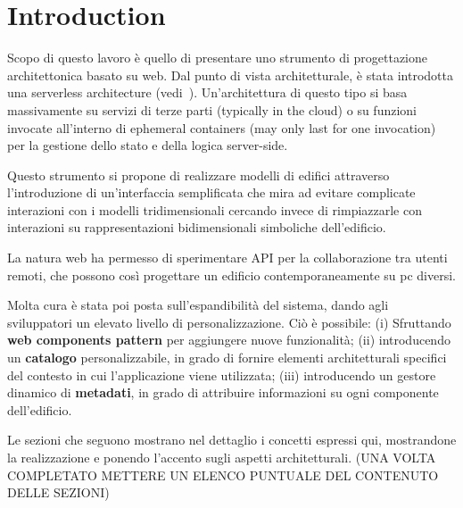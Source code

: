 \section{Introduction}

Scopo di questo lavoro \`e quello di presentare uno strumento di progettazione architettonica basato su web. Dal punto di vista architetturale, \`e stata introdotta una serverless architecture (vedi~\cite{Roberts}). Un'architettura di questo tipo si basa massivamente su servizi di terze parti (typically in the cloud) o su funzioni invocate all'interno di ephemeral containers (may only last for one invocation) per la gestione dello stato e della logica server-side.

Questo strumento si propone di realizzare modelli di edifici attraverso l'introduzione di un'interfaccia semplificata che mira ad evitare complicate interazioni con i modelli tridimensionali cercando invece di rimpiazzarle con interazioni su rappresentazioni bidimensionali simboliche dell'edificio.

La natura web ha permesso di sperimentare API per la collaborazione tra utenti remoti, che possono cos\`i progettare un edificio contemporaneamente su pc diversi.

Molta cura \`e stata poi posta sull'espandibilit\`a del sistema, dando agli sviluppatori un elevato livello di personalizzazione. Ci\`o \`e possibile: (i) Sfruttando \textbf{web components pattern} per aggiungere nuove funzionalità; (ii) introducendo un \textbf{catalogo} personalizzabile, in grado di fornire elementi architetturali specifici del contesto in cui l'applicazione viene utilizzata; (iii) introducendo un gestore dinamico di \textbf{metadati}, in grado di attribuire informazioni su ogni componente dell'edificio.


Le sezioni che seguono mostrano nel dettaglio i concetti espressi qui, mostrandone la realizzazione e ponendo l'accento sugli aspetti architetturali. (UNA VOLTA COMPLETATO METTERE UN ELENCO PUNTUALE DEL CONTENUTO DELLE SEZIONI)
